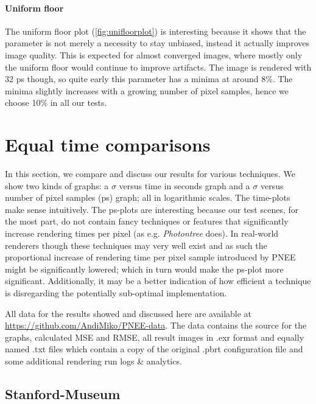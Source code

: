 \paragraph{Uniform floor}
\label{ch:ev:uniformfloor}
The uniform floor plot (\ref{fig:unifloorplot}) is interesting because it shows that the parameter is not merely a necessity to stay unbiased, instead it actually improves image quality. This is expected for almost converged images, where mostly only the uniform floor would continue to improve artifacts. The image is rendered with 32 ps though, so quite early this parameter has a minima at around 8\%. The minima slightly increases with a growing number of pixel samples, hence we choose 10\% in all our tests.




\section{Equal time comparisons}
\label{sec:etc}
In this section, we compare and discuss our results for various techniques. We show two kinds of graphs: a $\sigma$ versus time in seconds graph and a $\sigma$ versus number of pixel samples (ps) graph; all in logarithmic scales. The time-plots make sense intuitively. The ps-plots are interesting because our test scenes, for the most part, do not contain fancy techniques or features that significantly increase rendering times per pixel (as e.g. \textit{Photontree} does). In real-world renderers though these techniques may very well exist and as such the proportional increase of rendering time per pixel sample introduced by PNEE might be significantly lowered; which in turn would make the ps-plot more significant. Additionally, it may be a better indication of how efficient a technique is disregarding the potentially sub-optimal implementation.

All data for the results showed and discussed here are available at \url{https://github.com/AndiMiko/PNEE-data}. The data contains the source for the graphs, calculated MSE and RMSE, all result images in .exr format and equally named .txt files which contain a copy of the original .pbrt configuration file and some additional rendering run logs \& analytics.

\subsection{Stanford-Museum}
\label{sec:sm_eval}

\label{ch:ev:photontree}
\label{ch:ev:cdftree}

